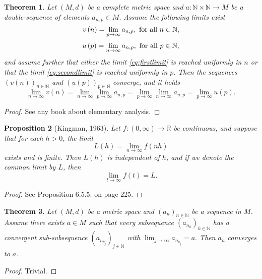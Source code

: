 \documentclass[12pt,a4paper]{scrartcl}
\newtheorem{theorem}{Theorem}[section]
\newtheorem{proposition}[theorem]{Proposition}
\numberwithin{equation}{section}
\newcommand{\R}{\mathbb{R}} %
\newcommand{\N}{\mathbb{N}} %
\begin{document}
\begin{theorem} \label{th:exchangelimits}
Let $\left(M,d\right)$ be a complete metric space and $a: \N \times \N \to M$ be a double-sequence of elements $a_{n,p} \in M.$ Assume the following limits exist
\begin{equation}\label{eq:firstlimit}
v\left(n\right) = \lim_{p \to \infty} a_{n,p}, \textnormal{ for all } n \in \N,
\end{equation}
\begin{equation}\label{eq:secondlimit}
u\left(p\right) = \lim_{n \to \infty} a_{n,p}, \textnormal{ for all } p \in \N,
\end{equation}
and assume further that either the limit \eqref{eq:firstlimit} is reached uniformly in $n$ or that the limit \eqref{eq:secondlimit} is reached uniformly in $p.$ Then the sequences $\left(v\left(n\right)\right)_{n \in \N}$ and $\left(u\left(p\right)\right)_{p \in \N}$ converge, and it holds
$$\lim_{n \to \infty} v\left(n\right) = \lim_{n \to \infty} \lim_{p \to \infty} a_{n,p} = \lim_{p \to \infty} \lim_{n \to \infty} a_{n,p} = \lim_{p \to \infty} u\left(p\right). $$
\end{theorem}
\begin{proof}
See any book about elementary analysis.
\end{proof}

\begin{proposition}[Kingman, 1963] \label{limitlemma}
Let $f:\left(0, \infty\right) \to \R$ be continuous, and suppose that for each $h > 0$, the limit
$$ L\left(h\right) = \lim_{n \to \infty} f\left(nh\right) $$
exists and is finite. Then $L\left(h\right)$ is independent of $h$, and if we denote the common limit by $L$, then
$$\lim_{t \to \infty} f\left(t\right) = L.$$  
\end{proposition}
\begin{proof}
See \cite{anderson} Proposition 6.5.5. on page 225.
\end{proof}

\begin{theorem} \label{subsubsubsequencelemma}
Let $\left(M,d\right)$ be a metric space and $\left(a_n\right)_{n \in \N}$ be a sequence in $M$. Assume there exists $a \in M$ such that every subsequence $\left(a_{n_k}\right)_{k \in \N}$ has a convergent sub-subsequence $\left(a_{n_{k_j}}\right)_{j \in \N}$ with $\lim_{j \to \infty} a_{n_{k_j}} = a.$ Then $a_n$ converges to $a.$
\end{theorem}
\begin{proof}
Trivial.
\end{proof}
\end{document}
